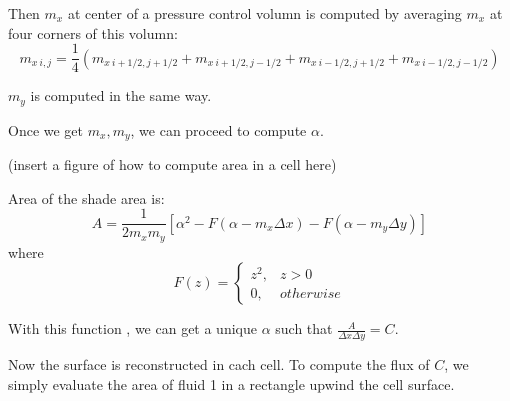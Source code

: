 \documentclass[11pt]{article}
\begin{document}
Then $m_x$ at center of a pressure control volumn is computed by averaging $m_x$ at four corners of this volumn:
\begin{equation}
    m_{x\ i,j} = \frac{1}{4} (m_{x\ i+1/2,j+1/2} +m_{x\ i+1/2,j-1/2} +m_{x\ i-1/2,j+1/2} +m_{x\ i-1/2,j-1/2}) 
    \label{}
\end{equation}


$m_y$ is computed in the same way.

Once we get $m_x, m_y$, we can proceed to compute $\alpha$.

(insert a figure of how to compute area in a cell here)

Area of the shade area is:
\begin{equation}
    A = \frac{1}{2m_x m_y}[\alpha ^{2} - F(\alpha - m_x \Delta x) - F(\alpha - m_y \Delta y)]
    \label{}
\end{equation}
where 
\begin{equation}
    F(z) = 
    \begin{cases}
        z^2, &z>0\\
        0, &otherwise
    \end{cases}
    \label{}
\end{equation}

With this function , we can get a unique $\alpha$ such that $\frac{A}{\Delta x \Delta y} = C$.

Now the surface is reconstructed in cach cell. To compute the flux of $C$, we simply evaluate the area of fluid 1 in a rectangle upwind  the cell surface.




\newpage
\end{document}

